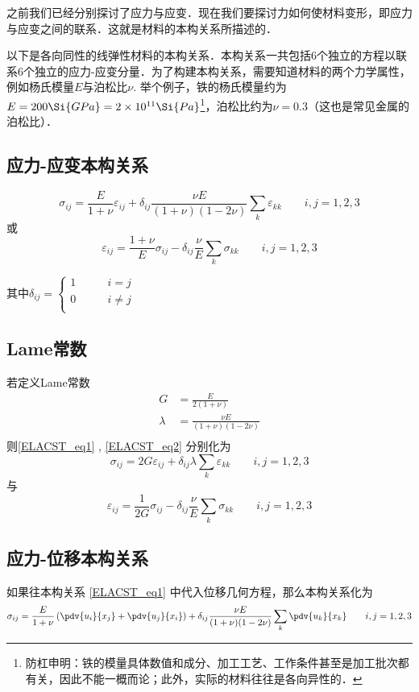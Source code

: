 
\begin{issues}
\issueDraft
\end{issues}

之前我们已经分别探讨了应力与应变．现在我们要探讨力如何使材料变形，即应力与应变之间的联系．这就是材料的本构关系所描述的．

以下是各向同性的线弹性材料的本构关系．本构关系一共包括$6$个独立的方程以联系$6$个独立的应力-应变分量．为了构建本构关系，需要知道材料的两个力学属性，例如杨氏模量$E$与泊松比$\nu$. 举个例子，铁的杨氏模量约为$E = 200 \Si{GPa} = 2 \times 10^{11} \Si{Pa}$\footnote{防杠申明：铁的模量具体数值和成分、加工工艺、工作条件甚至是加工批次都有关，因此不能一概而论；此外，实际的材料往往是各向异性的．}，泊松比约为$\nu=0.3$（这也是常见金属的泊松比）．

\subsection{应力-应变本构关系}
\begin{equation}\label{ELACST_eq1}
\sigma_{ij}=\frac{E}{1+\nu}\varepsilon_{ij}+\delta_{ij}\frac{\nu E}{(1+\nu)(1-2\nu)}\sum_k\varepsilon_{kk}\qquad i,j=1,2,3
\end{equation}
或
\begin{equation}\label{ELACST_eq2}
\varepsilon_{ij}=\frac{1+\nu}{E}\sigma_{ij}-\delta_{ij}\frac{\nu}{E}\sum_k\sigma_{kk} \qquad i,j=1,2,3
\end{equation}

其中$\delta_{ij} = \left \{
\begin{aligned}
1 &\qquad i = j\\
0 &\qquad i \ne j\\
\end{aligned}
\right.
$

\subsection{Lame常数}
若定义Lame常数
\begin{equation}
\begin{aligned}
G&=\frac{E}{2(1+\nu)}\\
\lambda &= \frac{\nu E}{(1+\nu)(1-2\nu)}\\
\end{aligned}
\end{equation}
则\autoref{ELACST_eq1} , \autoref{ELACST_eq2} 分别化为
\begin{equation}
\sigma_{ij}=2G\varepsilon_{ij}+\delta_{ij}\lambda\sum_k\varepsilon_{kk}\qquad i,j=1,2,3
\end{equation}
与
\begin{equation}
\varepsilon_{ij}=\frac{1}{2G}\sigma_{ij}-\delta_{ij}\frac{\nu}{E}\sum_k\sigma_{kk} \qquad i,j=1,2,3
\end{equation}

\subsection{应力-位移本构关系}
如果往本构关系 \autoref{ELACST_eq1} 中代入位移几何方程，那么本构关系化为
\begin{equation}
\sigma_{ij}=\frac{E}{1+\nu}\left(\pdv{u_i}{x_j}+\pdv{u_j}{x_i}\right)
+\delta_{ij}\frac{\nu E}{(1+\nu)(1-2\nu)}\sum_k\pdv{u_k}{x_k}\qquad i,j=1,2,3
\end{equation}
